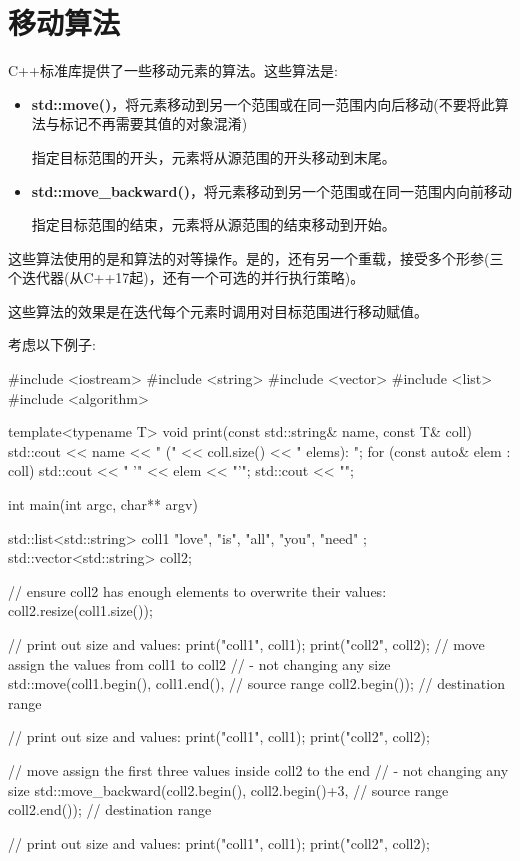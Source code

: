 \section{移动算法}
C++标准库提供了一些移动元素的算法。这些算法是:

\begin{itemize}
	\item \textbf{std::move()}，将元素移动到另一个范围或在同一范围内向后移动(不要将此算法与标记不再需要其值的对象混淆)

	指定目标范围的开头，元素将从源范围的开头移动到末尾。
	\item \textbf{std::move_backward()}，将元素移动到另一个范围或在同一范围内向前移动

	指定目标范围的结束，元素将从源范围的结束移动到开始。
\end{itemize}

这些算法使用的是和算法的对等操作。是的，还有另一个重载，接受多个形参(三个迭代器(从C++17起)，还有一个可选的并行执行策略)。

这些算法的效果是在迭代每个元素时调用对目标范围进行移动赋值。

考虑以下例子:

\begin{cppcode}
#include <iostream>
#include <string>
#include <vector>
#include <list>
#include <algorithm>

template<typename T>
void print(const std::string& name, const T& coll)
{
	std::cout << name << " (" << coll.size() << " elems): ";
	for (const auto& elem : coll) {
		std::cout << " '" << elem << "'";
	}
	std::cout << "\n";
}

int main(int argc, char** argv)
{
	std::list<std::string> coll1 { "love", "is", "all", "you", "need" };
	std::vector<std::string> coll2;

	// ensure coll2 has enough elements to overwrite their values:
	coll2.resize(coll1.size());

	// print out size and values:
	print("coll1", coll1);
	print("coll2", coll2);
	// move assign the values from coll1 to coll2
	// - not changing any size
	std::move(coll1.begin(), coll1.end(), // source range
	coll2.begin()); // destination range

	// print out size and values:
	print("coll1", coll1);
	print("coll2", coll2);

	// move assign the first three values inside coll2 to the end
	// - not changing any size
	std::move_backward(coll2.begin(), coll2.begin()+3, // source range
	coll2.end()); // destination range

	// print out size and values:
	print("coll1", coll1);
	print("coll2", coll2);
}
\end{cppcode}

